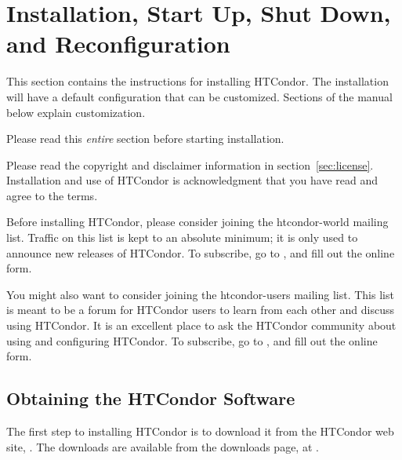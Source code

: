 \section{\label{sec:install}Installation, Start Up, Shut Down, and Reconfiguration}


This section contains the instructions for installing HTCondor.
The installation will have a default configuration that can
be customized.
Sections of the manual below explain customization.

Please read this \emph{entire} section before starting installation.

Please read the copyright and disclaimer information in
section~\ref{sec:license}.
Installation and
use of HTCondor is acknowledgment that you have read and agree to the
terms.

Before installing HTCondor, please consider joining the htcondor-world mailing
list.
Traffic on this list is kept to an absolute minimum;
it is only used to announce new releases of HTCondor.
To subscribe, go to
,
and fill out the online form.

You might also want to consider joining the htcondor-users mailing list.
This list is meant to be a forum for HTCondor users to learn from each
other and discuss using HTCondor. It is an excellent place to ask
the HTCondor community about using and configuring HTCondor.
To subscribe, go to
,
and fill out the online form.

\subsection{\label{sec:pre-install-procedure}
Obtaining the HTCondor Software}
The first step to installing HTCondor is to download it from the HTCondor
web site, .
The downloads are available from the downloads page,
at .

